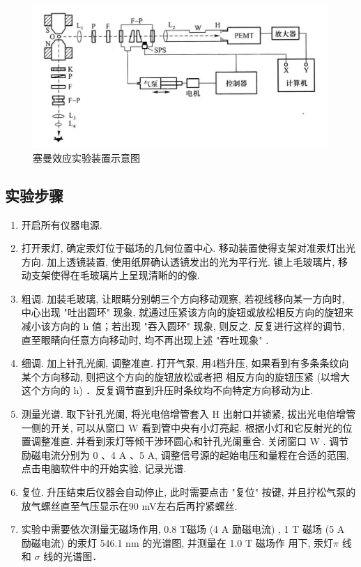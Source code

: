 \documentclass[font=default]{mpltx}
\begin{document}
\begin{figure}[htbp]
  \centering
  \includegraphics[width=0.85\linewidth]{fig/shiyanzhuangzhi.png}
  \caption{塞曼效应实验装置示意图}
  \label{fig:zhaungzhi}
\end{figure}


\subsection{实验步骤}
  \begin{enumerate}
    \item 开启所有仪器电源.
    \item 打开汞灯, 确定汞灯位于磁场的几何位置中心. 移动装置使得支架对准汞灯出光方向. 加上透镜装置, 使用纸屏确认透镜发出的光为平行光. 锁上毛玻璃片, 移动支架使得在毛玻璃片上呈现清晰的的像. 
    \item 粗调. 加装毛玻璃, 让眼睛分别朝三个方向移动观察, 若视线移向某一方向时, 
    中心出现 "吐出圆环" 现象, 就通过压紧该方向的旋钮或放松相反方向的旋钮来减小该方向的 h 值；若出现 "吞入圆环" 现象, 则反之. 
    反复进行这样的调节, 直至眼睛向任意方向移动时, 均不再出现上述  "吞吐现象" . 
    \item 细调. 加上针孔光阑, 调整准直. 打开气泵, 用4档升压, 如果看到有多条条纹向某个方向移动, 则把这个方向的旋钮放松或者把
相反方向的旋钮压紧 (以增大这个方向的 h) ．反复调节直到升压时条纹均不向特定方向移动为止. 
    \item 测量光谱. 取下针孔光阑, 将光电倍增管套入 H 出射口并锁紧, 拔出光电倍增管一侧的开关, 可以从窗口 W 看到管中央有小灯亮起. 根据小灯和它反射光的位置调整准直. 
并看到汞灯等倾干涉环圆心和针孔光阑重合. 关闭窗口 W . 调节励磁电流分别为 0 、4 A 、5 A, 调整信号源的起始电压和量程在合适的范围, 点击电脑软件中的开始实验, 记录光谱. 
    \item 复位. 升压结束后仪器会自动停止, 此时需要点击 "复位" 按键, 并且拧松气泵的放气螺丝直至气压显示在90 mV左右后再拧紧螺丝. 
    \item 实验中需要依次测量无磁场作用, 0.8 T磁场 (4 A 励磁电流) , 1 T 磁场 (5 A 励磁电流) 的汞灯 546.1 nm 的光谱图, 并测量在 1.0 T 磁场作
用下, 汞灯$\pi$ 线和 $\sigma$ 线的光谱图．
  \end{enumerate}
\end{document}
